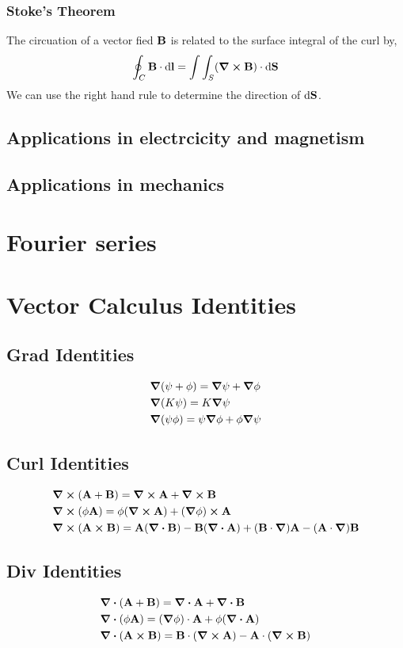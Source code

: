 \documentclass{book}
\begin{document}
\subsection{Stoke's Theorem}
The circuation of a vector fied $\vb{B}$ is related to the surface integral of the curl by,
\begin{equation}
	\oint_C \vb{B}\cdot\dd{\vb{l}} = \int\int_S (\curl{\vb{B}})\cdot\dd{\vb{S}}
\end{equation}
We can use the right hand rule to determine the direction of $\dd{\vb{S}}$.
\section{Applications in electrcicity and magnetism}
\section{Applications in mechanics}
\chapter{Fourier series}
\appendix
\chapter{Vector Calculus Identities}
\section{Grad Identities}
\begin{align}
    & \grad(\psi + \phi) = \grad\psi + \grad\phi \\
    & \grad(K\psi) = K\grad\psi \\
    & \grad(\psi\phi) = \psi\grad\phi + \phi\grad\psi 
\end{align}
\section{Curl Identities}
\begin{align}
    & \curl{(\vb{A}+\vb{B})} = \curl{\vb{A}} + \curl{\vb{B}} \\
    & \curl{(\phi\vb{A})} = \phi(\curl{\vb{A}})+(\grad\phi)\cross\vb{A} \\
    & \curl{(\vb{A}\cross\vb{B})} = \vb{A}(\div{\vb{B}})-\vb{B}(\div{\vb{A}})+(\vb{B}\cdot\grad)\vb{A}-(\vb{A}\cdot\grad)\vb{B}
\end{align}
\section{Div Identities}
\begin{align}
    & \div{(\vb{A}+\vb{B})} = \div{\vb{A}} + \div{\vb{B}} \\
    & \div{(\phi\vb{A})} = (\grad\phi)\cdot\vb{A} +\phi(\div{\vb{A}}) \\
    & \div{(\vb{A}\cross\vb{B})} = \vb{B}\cdot(\curl{\vb{A}})-\vb{A}\cdot(\curl{\vb{B}})
\end{align}
\end{document}
